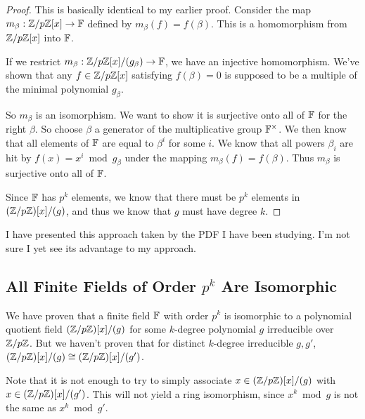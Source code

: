 \begin{proof}
  This is basically identical to my earlier proof. Consider the map
  $m_\beta: \mathbb{Z} / p\mathbb{Z}[x] \to \mathbb{F}$ defined by $m_\beta(f) = f(\beta)$. This
  is a homomorphism from $\mathbb{Z} / p\mathbb{Z}[x]$ into $\mathbb{F}$.

  If we restrict $m_\beta: \mathbb{Z} / p\mathbb{Z}[x]/(g_\beta) \to \mathbb{F}$, we have an
  injective homomorphism. We've shown that any $f \in \mathbb{Z} / p\mathbb{Z}[x]$
  satisfying $f(\beta) = 0$ is supposed to be a multiple of the minimal
  polynomial $g_\beta$.

  So $m_\beta$ is an isomorphism. We want to show it is surjective onto
  all of $\mathbb{F}$ for the right $\beta$. So choose $\beta$ a generator of
  the multiplicative group $\mathbb{F}^\times$. We then know that all elements
  of $\mathbb{F}$ are equal to $\beta^i$ for some $i$. We know that all powers
  $\beta_i$ are hit by $f(x) = x^i \bmod g_\beta$ under the mapping
  $m_\beta(f) = f(\beta)$. Thus $m_\beta$ is surjective onto all of
  $\mathbb{F}$.

  Since $\mathbb{F}$ has $p^k$ elements, we know that there must be $p^k$
  elements in $\mathopen{}\left( {\mathbb{Z} / p\mathbb{Z}} \right)\mathclose{}[x]/(g)$, and thus we know that $g$ must have degree $k$.
\end{proof}

\begin{remark}
  I have presented this approach taken by the PDF I have been studying.
  I'm not sure I yet see its advantage to my approach.
\end{remark}

\subsection{All Finite Fields of Order $p^k$ Are Isomorphic}

\begin{remark}
  We have proven that a finite field $\mathbb{F}$ with order $p^k$ is isomorphic
  to a polynomial quotient field $\mathopen{}\left( {\mathbb{Z} / p\mathbb{Z}} \right)\mathclose{}[x]/(g)$ for some
  $k$-degree polynomial $g$ irreducible over $\mathbb{Z} / p\mathbb{Z}$. But we haven't
  proven that for distinct $k$-degree irreducible $g, g'$,
  $\mathopen{}\left( {\mathbb{Z} / p\mathbb{Z}} \right)\mathclose{}[x]/(g) \cong \mathopen{}\left( {\mathbb{Z} / p\mathbb{Z}} \right)\mathclose{}[x]/(g')$.

  Note that it is not enough to try to simply associate $x \in
  \mathopen{}\left( {\mathbb{Z} / p\mathbb{Z}} \right)\mathclose{}[x]/(g)$ with $x \in \mathopen{}\left( {\mathbb{Z} / p\mathbb{Z}} \right)\mathclose{}[x]/(g')$. This
  will not yield a ring isomorphism, since $x^k \bmod g$ is not the same
  as $x^k \bmod g'$.
\end{remark}

